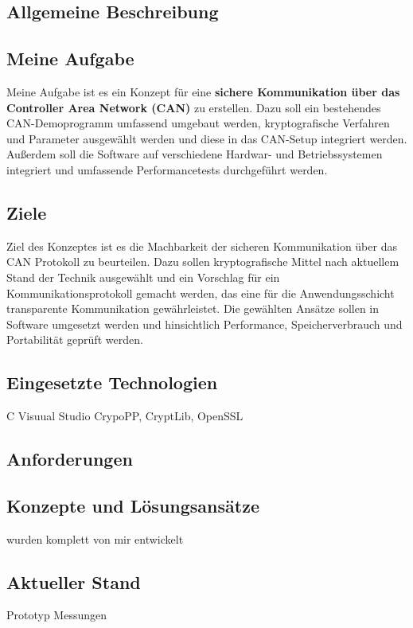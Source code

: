 \subsection{Allgemeine Beschreibung}
\subsection{Meine Aufgabe} %
Meine Aufgabe ist es ein Konzept für eine \textbf{sichere Kommunikation über das Controller Area Network (CAN)} zu erstellen. Dazu soll ein bestehendes CAN-Demoprogramm umfassend umgebaut werden, kryptografische Verfahren und Parameter ausgewählt werden und diese in das CAN-Setup integriert werden. Außerdem soll die Software auf verschiedene Hardwar- und Betriebssystemen integriert und umfassende Performancetests durchgeführt werden. 

\subsection{Ziele}
Ziel des Konzeptes ist es die Machbarkeit der sicheren Kommunikation über das CAN Protokoll zu beurteilen. Dazu sollen kryptografische Mittel nach aktuellem Stand der Technik ausgewählt und ein Vorschlag für ein Kommunikationsprotokoll gemacht werden, das eine für die Anwendungsschicht transparente Kommunikation gewährleistet. Die gewählten Ansätze sollen in Software umgesetzt werden und hinsichtlich Performance, Speicherverbrauch und Portabilität geprüft werden. 


\subsection{Eingesetzte Technologien}
C 
Visuual Studio 
CrypoPP, CryptLib, OpenSSL


\subsection{Anforderungen}
\subsection{Konzepte und Lösungsansätze}
wurden komplett von mir entwickelt

\subsection{Aktueller Stand} %
Prototyp 
Messungen
